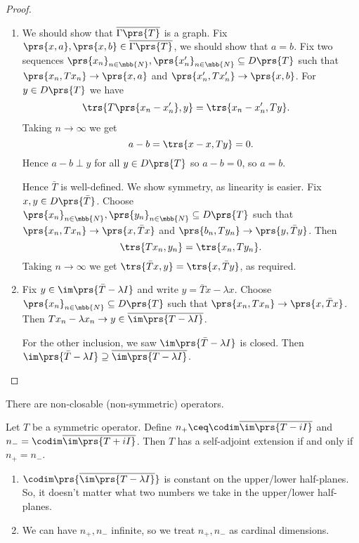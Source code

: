 \documentclass[10pt, twoside]{book}
\begin{document}
\begin{proof}
\begin{enumerate}
\item We should show that $\overline{\Gamma\prs{T}}$ is a graph. Fix $\prs{x,a}, \prs{x,b} \in \overline{\Gamma\prs{T}}$, we should show that $a=b$.
Fix two sequences $\prs{x_n}_{n \in \mbb{N}}, \prs{x_n'}_{n \in \mbb{N}} \subseteq D\prs{T}$ such that $\prs{x_n, T x_n} \to \prs{x,a}$ and $\prs{x_n', T x_n'} \to \prs{x,b}$.
For $y \in D\prs{T}$ we have
\begin{align*}
\trs{T\prs{x_n - x_n'}, y} &= \trs{x_n - x_n', Ty} \text{.}
\end{align*}
Taking $n \to \infty$ we get
\[a-b = \trs{x-x, Ty} = 0 \text{.}\]
Hence $a-b \perp y$ for all $y \in D\prs{T}$ so $a-b = 0$, so $a=b$.

Hence $\bar{T}$ is well-defined. We show symmetry, as linearity is easier.
Fix $x,y \in D\prs{\bar{T}}$. Choose $\prs{x_n}_{n \in \mbb{N}}, \prs{y_n}_{n \in \mbb{N}} \subseteq D\prs{T}$ such that $\prs{x_n, T x_n} \to \prs{x, \bar{T} x}$ and $\prs{b_n, T y_n} \to \prs{y, \bar{T} y}$. Then
\[\trs{T x_n, y_n} = \trs{x_n, T y_n} \text{.}\]
Taking $n \to \infty$ we get $\trs{\bar{T}x, y} = \trs{x, \bar{T}y}$, as required.

\item
Fix $y \in \im\prs{\bar{T} - \lambda I}$ and write $y = \bar{T} x - \lambda x$. Choose $\prs{x_n}_{n \in \mbb{N}} \subseteq D\prs{T}$ such that $\prs{x_n, T x_n} \to \prs{x, \bar{T} x}$. Then $T x_n - \lambda x_n \to y \in \overline{\im\prs{T - \lambda I}}$.

For the other inclusion, we saw $\im\prs{\bar{T} - \lambda I}$ is closed. Then $\im\prs{\bar{T} - \lambda I} \supseteq \overline{\im\prs{T - \lambda I}}$.
\end{enumerate}
\end{proof}

\begin{remark}
There are non-closable (non-symmetric) operators.
\end{remark}

\begin{theorem}
Let $T$ be a symmetric operator.
Define $n_+ \ceq \codim \overline{\im\prs{T - iI}}$ and $n_- = \codim \overline{\im\prs{T + iI}}$.
Then $T$ has a self-adjoint extension if and only if $n_+ = n_-$.
\end{theorem}


\begin{remark}
\begin{enumerate}
\item $\codim\prs{\overline{\im\prs{T - \lambda I}}}$ is constant on the upper/lower half-planes. So, it doesn't matter what two numbers we take in the upper/lower half-planes.
\item We can have $n_+, n_-$ infinite, so we treat $n_+, n_-$ as cardinal dimensions.
\end{enumerate}
\end{remark}
\end{document}

